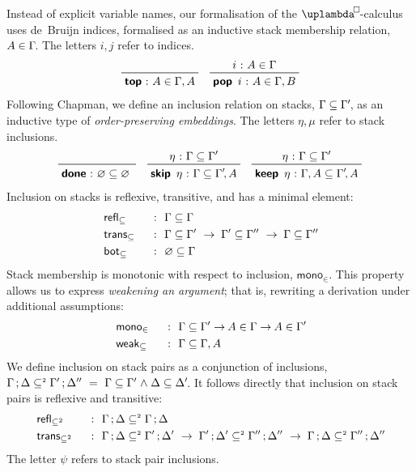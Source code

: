 \documentclass[submission,copyright,creativecommons,sharealike,backref=page]{eptcs}
\newcommand{\uplambdabox}{\uplambda^{\mkern-3mu\Box\mkern-3mu}}
\renewcommand{\leq}{\mathrel{\subseteq}}
\newcommand{\leqII}{\mathrel{\subseteq^{\scriptscriptstyle{2}}}}
\renewcommand{\:}{\mathop{\mkern3mu:\mkern3mu}}
\renewcommand{\.}{\mathop{\mkern3mu.\mkern3mu}}
\renewcommand{\;}{\mathop{;}}
\renewcommand{\,}{\mathop{,}}
\newcommand{\conj}{\mathrel{\wedge}}
\renewcommand{\r}{\mathrel{\rightarrow\mkern-1mu}}
\newcommand{\monoin}{\operatorname{\textsf{mono}_{\in}}}
\newcommand{\botleq}{\operatorname{\textsf{bot}_{\leq}}}
\newcommand{\weakleq}{\operatorname{\textsf{weak}_{\leq}}}
\newcommand{\reflleq}{\operatorname{\textsf{refl}_{\leq}}}
\newcommand{\reflleqII}{\operatorname{\textsf{refl}_{\leqII}}}
\newcommand{\transleq}{\operatorname{\textsf{trans}_{\leq}}}
\newcommand{\transleqII}{\operatorname{\textsf{trans}_{\leqII}}}
\renewcommand{\O}{\varnothing}
\newcommand{\donel}{\operatorname{\textsf{\textbf{done}}}}
\newcommand{\keepl}{\operatorname{\textsf{\textbf{keep}}}}
\newcommand{\skipl}{\operatorname{\textsf{\textbf{skip}}}}
\newcommand{\tops}{\operatorname{\textsf{\textbf{top}}}}
\newcommand{\pops}{\operatorname{\textsf{\textbf{pop}}}}
\theoremstyle{mystyle}
\begin{document}
Instead of explicit variable names, our formalisation of the $\uplambdabox$-calculus uses de~Bruijn indices, formalised as an inductive stack membership relation, $A \in \Gamma\mkern-3mu$.  The letters $i, j$ refer to indices.
\begin{align*}
  \prftree
    {}
    {\tops \: A \in \Gamma, A}
  \quad
  \prftree
    {i \: A \in \Gamma}
    {\pops~i \: A \in \Gamma, B}
\end{align*}
Following Chapman\cite{Chapman09}, we define an inclusion relation on stacks, $\Gamma \leq \Gamma'\mkern-3mu$, as an inductive type of \emph{order-preserving embeddings}.  The letters $\eta, \mu$ refer to stack inclusions.
\begin{align*}
  \prftree
    {}
    {\donel \: \O \leq \O \phantom{'}}
  \quad
  \prftree
    {\eta \: \Gamma \leq \Gamma'}
    {\skipl~\eta \: \Gamma \leq \Gamma'\mkern-3mu, A}
  \quad
  \prftree
    {\eta \: \Gamma \leq \Gamma'}
    {\keepl~\eta \: \Gamma, A \leq \Gamma'\mkern-3mu, A}
\end{align*}
Inclusion on stacks is reflexive, transitive, and has a minimal element:
\begin{alignat*}{2}
  & \reflleq    && ~\:~ \Gamma \leq \Gamma\\
  & \transleq   && ~\:~ \Gamma \leq \Gamma' ~\r~ \Gamma' \leq \Gamma'' ~\r~ \Gamma \leq \Gamma''\\
  & \botleq     && ~\:~ \O \leq \Gamma
\end{alignat*}
Stack membership is monotonic with respect to inclusion, $\monoin$.  This property allows us to express \emph{weakening an argument}; that is, rewriting a derivation under additional assumptions:
\begin{alignat*}{2}
  & \monoin     && ~\:~ \Gamma \leq \Gamma' \r A \in \Gamma \r A \in \Gamma'\\
  & \weakleq    && ~\:~ \Gamma \leq \Gamma, A
\end{alignat*}
We define inclusion on stack pairs as a conjunction of inclusions, $\Gamma \; \Delta \leqII \Gamma' \; \Delta'' ~=~ \Gamma \leq \Gamma' \conj \Delta \leq \Delta'\mkern-3mu$.  It follows directly that inclusion on stack pairs is reflexive and transitive:
\begin{alignat*}{2}
  & \reflleqII  && ~\:~ \Gamma \; \Delta \leqII \Gamma \; \Delta\\
  & \transleqII && ~\:~ \Gamma \; \Delta \leqII \Gamma' \; \Delta' ~\r~ \Gamma' \; \Delta' \leqII \Gamma'' \; \Delta'' ~\r~ \Gamma \; \Delta \leqII \Gamma'' \; \Delta''
\end{alignat*}
The letter $\psi$ refers to stack pair inclusions.
\end{document}
